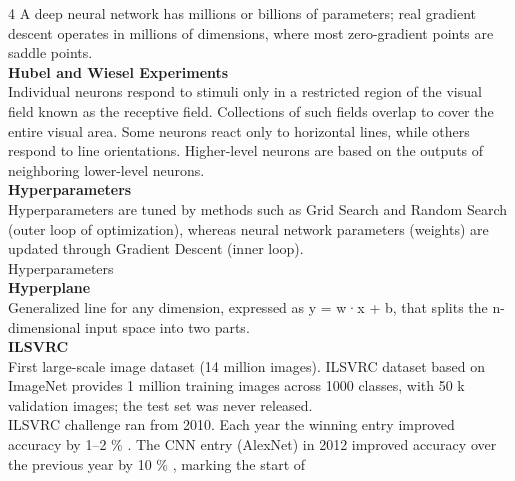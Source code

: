 \documentclass[8pt]{extarticle}
\begin{document}
\begin{multicols}{4}
A deep neural network has millions or billions of parameters; real gradient descent operates in millions of dimensions, where most zero-gradient points are saddle points.\\
\vspace{2pt}\textbf{Hubel and Wiesel Experiments}\\
Individual neurons respond to stimuli only in a restricted region of the visual field known as the receptive field. Collections of such fields overlap to cover the entire visual area. Some neurons react only to horizontal lines, while others respond to line orientations. Higher-level neurons are based on the outputs of neighboring lower-level neurons.\\
\vspace{2pt}\textbf{Hyperparameters}\\
Hyperparameters are tuned by methods such as Grid Search and Random Search (outer loop of optimization), whereas neural network parameters (weights) are updated through Gradient Descent (inner loop).\\
Hyperparameters\\
\vspace{2pt}\textbf{Hyperplane}\\
Generalized line for any dimension, expressed as y = w·x + b, that splits the n-dimensional input space into two parts.\\
\vspace{2pt}\textbf{ILSVRC}\\
First large-scale image dataset (14 million images). ILSVRC dataset based on ImageNet provides 1 million training images across 1000 classes, with 50 k validation images; the test set was never released.\\
ILSVRC challenge ran from 2010. Each year the winning entry improved accuracy by 1--2 \% . The CNN entry (AlexNet) in 2012 improved accuracy over the previous year by 10 \% , marking the start of


\end{multicols}
\end{document}
